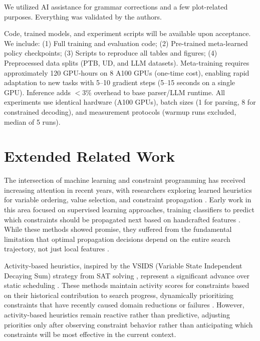 \documentclass[11pt]{article}
\begin{document}
We utilized AI assistance for grammar corrections and a few plot-related purposes. Everything was validated by the authors.

Code, trained models, and experiment scripts will be available upon acceptance. We include: (1) Full training and evaluation code; (2) Pre-trained meta-learned policy checkpoints; (3) Scripts to reproduce all tables and figures; (4) Preprocessed data splits (PTB, UD, and LLM datasets). Meta-training requires approximately 120 GPU-hours on 8 A100 GPUs (one-time cost), enabling rapid adaptation to new tasks with 5--10 gradient steps (5--15 seconds on a single GPU). Inference adds $<$3\% overhead to base parser/LLM runtime. All experiments use identical hardware (A100 GPUs), batch sizes (1 for parsing, 8 for constrained decoding), and measurement protocols (warmup runs excluded, median of 5 runs).

\section{Extended Related Work}
\label{app:related_work}
The intersection of machine learning and constraint programming has received increasing attention in recent years, with researchers exploring learned heuristics for variable ordering, value selection, and constraint propagation \citep{gasse2019exact,cappart2021combinatorial,nair2020solving}. Early work in this area focused on supervised learning approaches, training classifiers to predict which constraints should be propagated next based on handcrafted features \citep{wallace1996practical,benhamou2004interval,andrew2007scalable}. While these methods showed promise, they suffered from the fundamental limitation that optimal propagation decisions depend on the entire search trajectory, not just local features \citep{Ando2005,rasooli-tetrault-2015}.

Activity-based heuristics, inspired by the VSIDS (Variable State Independent Decaying Sum) strategy from SAT solving \citep{moskewicz2001chaff,marques2012activity}, represent a significant advance over static scheduling \citep{regin1994filtering,lecoutre2009str}. These methods maintain activity scores for constraints based on their historical contribution to search progress, dynamically prioritizing constraints that have recently caused domain reductions or failures \citep{audemard2013glucose,debruyne1997optimal}. However, activity-based heuristics remain reactive rather than predictive, adjusting priorities only after observing constraint behavior rather than anticipating which constraints will be most effective in the current context.
\end{document}
